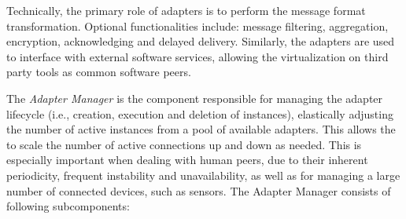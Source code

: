

    Technically, the primary role of adapters is to perform the message format transformation. Optional functionalities include: message filtering, aggregation, encryption, acknowledging and delayed delivery. Similarly, the adapters are used to interface \mdl{} with external software services, allowing the virtualization on third party tools as common software peers.


    The \emph{Adapter Manager} is the component responsible for managing the adapter lifecycle (i.e., creation, execution and deletion of instances), elastically adjusting the number of active instances from a pool of available adapters. This allows the \mdl{} to scale the number of active connections up and down as needed. This is especially important when dealing with human peers, due to their inherent periodicity, frequent instability and unavailability, as well as for managing a large number of connected devices, such as sensors. The Adapter Manager consists of following subcomponents: 

